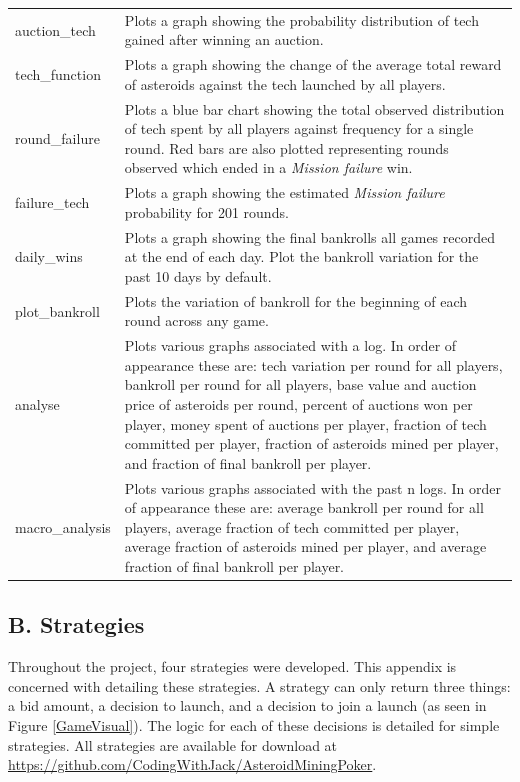 \documentclass[11pt, twoside]{article}
\begin{document}
\begin{longtable}{p{}p{}}
	auction\_tech & Plots a graph showing the probability distribution of tech gained after winning an auction. \\
	tech\_function & Plots a graph showing the change of the average total reward of asteroids against the tech launched by all players. \\
	round\_failure & Plots a blue bar chart showing the total observed distribution of tech spent by all players against frequency for a single round. Red bars are also plotted representing rounds observed which ended in a \textit{Mission failure} win. \\
	failure\_tech & Plots a graph showing the estimated \textit{Mission failure} probability for 201 rounds. \\
	daily\_wins & Plots a graph showing the final bankrolls all games recorded at the end of each day. Plot the bankroll variation for the past 10 days by default. \\
	plot\_bankroll & Plots the variation of bankroll for the beginning of each round across any game. \\
	analyse & Plots various graphs associated with a log. In order of appearance these are: tech variation per round for all players, bankroll per round for all players, base value and auction price of asteroids per round, percent of auctions won per player, money spent of auctions per player, fraction of tech committed per player, fraction of asteroids mined per player, and fraction of final bankroll per player. \\
	macro\_analysis & Plots various graphs associated with the past n logs. In order of	appearance these are: average bankroll per round for all players, average fraction of tech committed per player, average fraction of asteroids mined per player, and average fraction of final bankroll per player.
	\label{tab:pstructure}
\end{longtable}

\subsection*{B. Strategies}

Throughout the project, four strategies were developed. This appendix is concerned with detailing these strategies. A strategy can only return three things: a bid amount, a decision to launch, and a decision to join a launch (as seen in Figure \ref{GameVisual}). The logic for each of these decisions is detailed for simple strategies. All strategies are available for download at \url{https://github.com/CodingWithJack/AsteroidMiningPoker}.
\end{document}
